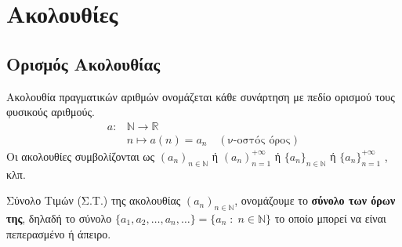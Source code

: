 




\newcommand{\twocolumnsidesss}[2]{\begin{minipage}[t]{0.49\linewidth}\raggedright
        #1
        \end{minipage}\hfill\begin{minipage}[t]{0.49\linewidth}\raggedright
        #2
    \end{minipage}
}


\pagestyle{askhseis}




\chapter{Ακολουθίες}

\section{Ορισμός Ακολουθίας}

\begin{mybox1}
  \begin{dfn}
    \textcolor{Col1}{Ακολουθία} πραγματικών αριθμών ονομάζεται 
    κάθε συνάρτηση με πεδίο ορισμού τους φυσικούς αριθμούς. 
    \begin{align*}
      a \colon &\mathbb{N} \to \mathbb{R} \\
               &n \mapsto a(n)=a_{n} \quad (\text{ν-οστός όρος})
    \end{align*} 
    Οι ακολουθίες συμβολίζονται ως $ (a_{n})_{n \in \mathbb{N}} $ 
    ή $ ( a_{n} ) _{n=1}^{+\infty}$  ή $ \{ a_{n} \} _{n \in \mathbb{N}} $ ή 
    $ \{ a_{n} \} _{n=1}^{+\infty}$ , κλπ.
  \end{dfn}
\end{mybox1}

\begin{mybox1}
  \begin{dfn}
    \textcolor{Col1}{Σύνολο Τιμών} (Σ.Τ.) της ακολουθίας 
    $ (a_{n})_{n \in \mathbb{N}} $, ονομάζουμε το \textbf{σύνολο των όρων της}, 
    δηλαδή το σύνολο $ \{ a_{1}, a_{2}, \ldots, a_{n}, \ldots \} = \{ a_{n} \; : \; n
    \in \mathbb{N} \} $ το οποίο μπορεί να είναι πεπερασμένο ή άπειρο.
  \end{dfn}
\end{mybox1}

